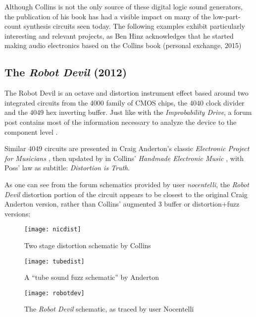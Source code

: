 Although Collins is not the only source of these digital logic sound generators, the publication of his book has had a visible impact on many of the low-part-count synthesis circuits seen today. The following examples exhibit particularly interesting and relevant projects, as Ben Hinz acknowledges that he started making audio electronics based on the Collins book (personal exchange, 2015)

\subsection{The \textit{Robot Devil} (2012)}

The Robot Devil is an octave and distortion instrument effect based around two integrated circuits from the 4000 family of CMOS chips, the 4040 clock divider and the 4049 hex inverting buffer. Just like with the \textit{Improbability Drive}, a forum post contains most of the information necessary to analyze the device to the component level \citep{freestomp2}. 

Similar 4049 circuits are presented in Craig Anderton's classic \emph{Electronic Project for Musicians} \citep[p.173]{anderton1980}, then updated by in Collins' \emph{Handmade Electronic Music} \citep[p.155]{collins2006}, with Poss' law as subtitle: \emph{Distortion is Truth}.

As one can see from the forum schematics provided by user \emph{nocentelli}, the \textit{Robot Devil} distortion portion of the circuit appears to be closest to the original Craig Anderton version, rather than Collins' augmented 3 buffer or distortion+fuzz versions:

\begin{figure}[H]
	  \centering
	    \texttt{[image: nicdist]}
	    \caption{Two stage distortion schematic by Collins \citep[p.155]{collins2006}}
	\end{figure} 

\begin{figure}[H]
	  \centering
	    \texttt{[image: tubedist]}
	    \caption{A ``tube sound fuzz schematic'' by Anderton \citep[p173]{anderton1980}}
	\end{figure}

\begin{figure}[H]
	  \centering
	    \texttt{[image: robotdev]}
	    \caption{The \textit{Robot Devil} schematic, as traced by user Nocentelli \citep{freestomp2}}
	\end{figure}

